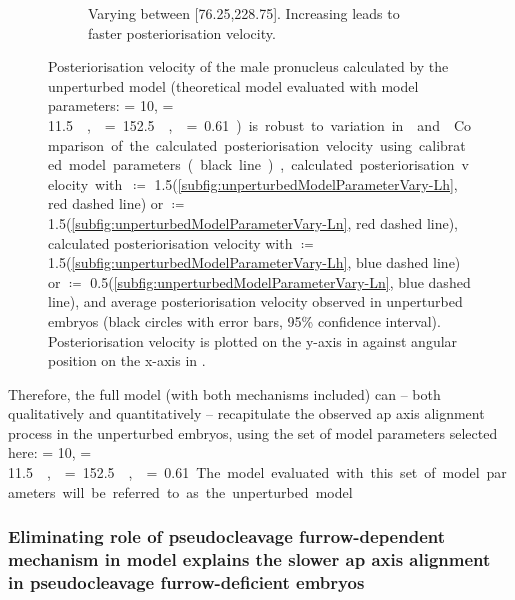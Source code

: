 \begin{figure}
\begin{subfigure}[t]{0.45\textwidth}
        \caption{Varying \nematicLength between [\SI{76.25}{\unitLength},\SI{228.75}{\unitLength}]. Increasing \nematicLength leads to faster posteriorisation velocity.}
        \label{subfig:unperturbedModelParameterVary-Ln}
    \end{subfigure}
    \caption[Effect of model parameter variation on calculated posteriorisation velocity]{Posteriorisation velocity of the male pronucleus calculated by the unperturbed model (theoretical model evaluated with model parameters: \hydrodynamicLength = \SI{10}{\unitLength}, \activeRelaxLength = \SI{11.5}{\square\unitLength\per\second}, \nematicLength = \SI{152.5}{\square\unitLength\per\second}, \dragCoefficient = \num{0.61}) is robust to variation in \hydrodynamicLength and \nematicLength. Comparison of the calculated posteriorisation velocity using calibrated model parameters (black line), calculated posteriorisation velocity with \hydrodynamicLength $\coloneqq$ \num{1.5}\hydrodynamicLength (\autoref{subfig:unperturbedModelParameterVary-Lh}, red dashed line) or \nematicLength $\coloneqq$ \num{1.5}\nematicLength (\autoref{subfig:unperturbedModelParameterVary-Ln}, red dashed line), calculated posteriorisation velocity with \hydrodynamicLength $\coloneqq$ \num{1.5}\hydrodynamicLength (\autoref{subfig:unperturbedModelParameterVary-Lh}, blue dashed line) or \nematicLength $\coloneqq$ \num{0.5}\nematicLength (\autoref{subfig:unperturbedModelParameterVary-Ln}, blue dashed line), and average posteriorisation velocity observed in unperturbed embryos (black circles with error bars, \num{95}\% confidence interval). Posteriorisation velocity is plotted on the y-axis in \si{\unitPostVel} against angular position on the x-axis in \si{\unitAngle}.}
    \label{fig:unperturbedModelParameterVary}
\end{figure}

Therefore, the full model (with both mechanisms included) can -- both qualitatively and quantitatively -- recapitulate the observed \ac{ap} axis alignment process in the unperturbed embryos, using the set of model parameters selected here: \hydrodynamicLength = \SI{10}{\unitLength}, \activeRelaxLength = \SI{11.5}{\square\unitLength\per\second}, \nematicLength = \SI{152.5}{\square\unitLength\per\second}, \dragCoefficient = \num{0.61}. The model evaluated with this set of model parameters will be referred to as the unperturbed model.

\FloatBarrier
\subsubsection{Eliminating role of pseudocleavage furrow-dependent mechanism in model explains the slower \acs{ap} axis alignment in pseudocleavage furrow-deficient embryos}\label{subsubsec:cytoModelForNop1Mel11}

